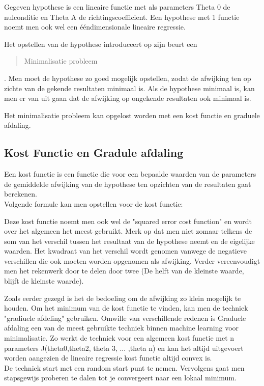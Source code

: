 Gegeven hypothese is een lineaire functie met als parameters Theta 0 de nulconditie en Theta A de richtingscoefficient. Een hypothese met 1 functie noemt men ook wel een ééndimensionale lineaire regressie.


Het opstellen van de hypothese introduceert op zijn beurt een \begin{quote}Minimalisatie probleem\end{quote}. Men moet de hypothese zo goed mogelijk opstellen, zodat de afwijking ten op zichte van de gekende resultaten minimaal is. Als de hypothese minimaal is, kan men er van uit gaan dat de afwijking op ongekende resultaten ook minimaal is.

Het minimalisatie probleem kan opgelost worden met een kost functie en graduele afdaling.

\subsection{Kost Functie en Gradule afdaling}\label{Kost Functie en Gradule afdaling}

Een kost functie is een functie die voor een bepaalde waarden van de parameters de gemiddelde afwijking van de hypothese ten opzichten van de resultaten gaat berekenen.
\\
Volgende formule kan men opstellen voor de kost functie:


Deze kost functie noemt men ook wel de "squared error cost function" en wordt over het algemeen het meest gebruikt. 
Merk op dat men niet zomaar telkens de som van het verschil tussen het resultaat van de hypothese neemt en de eigelijke waarden. Het kwadraat van het verschil wordt genomen vanwege de negatieve verschillen die ook moeten worden opgenomen als afwijking. Verder vereenvoudigt men het rekenwerk door te delen door twee (De helft van de kleinste waarde, blijft de kleinste waarde). 

Zoals eerder gezegd is het de bedoeling om de afwijking zo klein mogelijk te houden. Om het minimum van de kost functie te vinden, kan men de techniek "gradiuele afdeling" gebruiken. Omwille van verschillende redenen is Graduele afdaling een van de meest gebruikte techniek binnen machine learning voor minimalisatie. Zo werkt de techniek voor een algemeen kost functie met n parameters J(theta0,theta2, theta 3, ... ,theta n) en kan het altijd uitgevoert worden aangezien de lineaire regressie kost functie altijd convex is.
\\
De techniek start met een random start punt te nemen. Vervolgens gaat men stapsgewijs proberen te dalen tot je convergeert naar een lokaal minimum.

